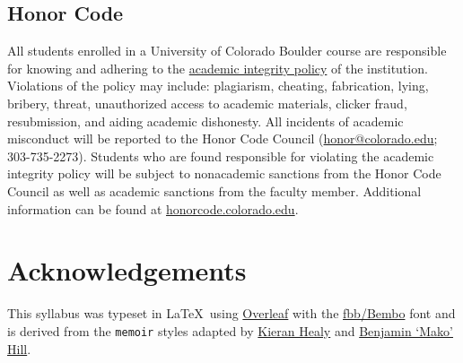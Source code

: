 \documentclass[10pt]{memoir}
\begin{document}
\subsection{Honor Code}
All students enrolled in a University of Colorado Boulder course are responsible for knowing and adhering to the \href{http://www.colorado.edu/policies/academic-integrity-policy}{academic integrity policy} of the institution. Violations of the policy may include: plagiarism, cheating, fabrication, lying, bribery, threat, unauthorized access to academic materials, clicker fraud, resubmission, and aiding academic dishonesty. All incidents of academic misconduct will be reported to the Honor Code Council (\href{mailto:honor@colorado.edu}{honor@colorado.edu}; 303-735-2273). Students who are found responsible for violating the academic integrity policy will be subject to nonacademic sanctions from the Honor Code Council as well as academic sanctions from the faculty member. Additional information can be found at \href{http://honorcode.colorado.edu}{honorcode.colorado.edu}. 





\section{Acknowledgements}

This syllabus was typeset in \LaTeX~using \href{http://www.sharelatex.com}{Overleaf} with the \href{http://www.tug.dk/FontCatalogue/fbb/}{fbb/Bembo} font and is derived from the \texttt{memoir} styles adapted by \href{https://github.com/kjhealy/latex-custom-kjh}{Kieran Healy} and \href{http://projects.mako.cc/source/?p=latex_mako;a=summary}{Benjamin `Mako' Hill}.

\clearpage


\renewcommand{\bibsection}{\section{\huge \bibname}\prebibhook}
\baselineskip 14.2pt

\end{document}

